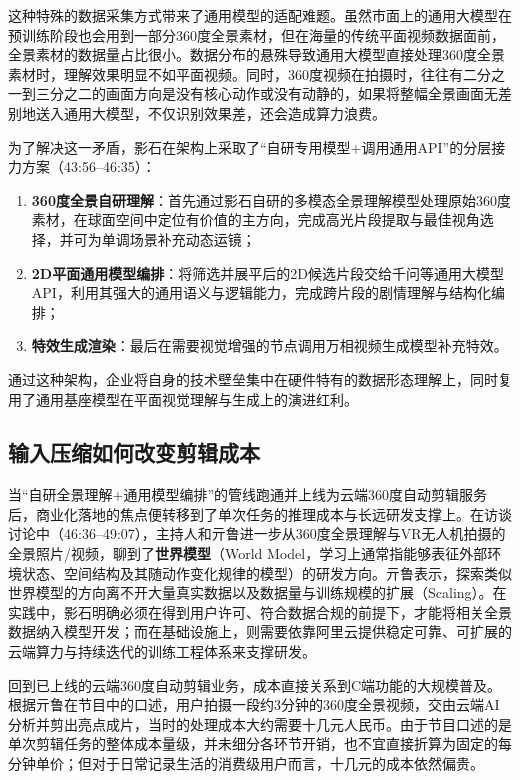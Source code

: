 \documentclass[UTF8,a4paper,11pt,fontset=fandol]{ctexart}
\begin{document}
这种特殊的数据采集方式带来了通用模型的适配难题。虽然市面上的通用大模型在预训练阶段也会用到一部分360度全景素材，但在海量的传统平面视频数据面前，全景素材的数据量占比很小。数据分布的悬殊导致通用大模型直接处理360度全景素材时，理解效果明显不如平面视频。同时，360度视频在拍摄时，往往有二分之一到三分之二的画面方向是没有核心动作或没有动静的，如果将整幅全景画面无差别地送入通用大模型，不仅识别效果差，还会造成算力浪费。

为了解决这一矛盾，影石在架构上采取了“自研专用模型+调用通用API”的分层接力方案（43:56–46:35）：
\begin{enumerate}
\item \textbf{360度全景自研理解}：首先通过影石自研的多模态全景理解模型处理原始360度素材，在球面空间中定位有价值的主方向，完成高光片段提取与最佳视角选择，并可为单调场景补充动态运镜；
\item \textbf{2D平面通用模型编排}：将筛选并展平后的2D候选片段交给千问等通用大模型API，利用其强大的通用语义与逻辑能力，完成跨片段的剧情理解与结构化编排；
\item \textbf{特效生成渲染}：最后在需要视觉增强的节点调用万相视频生成模型补充特效。
\end{enumerate}
通过这种架构，企业将自身的技术壁垒集中在硬件特有的数据形态理解上，同时复用了通用基座模型在平面视觉理解与生成上的演进红利。

\subsection{输入压缩如何改变剪辑成本}
当“自研全景理解+通用模型编排”的管线跑通并上线为云端360度自动剪辑服务后，商业化落地的焦点便转移到了单次任务的推理成本与长远研发支撑上。在访谈讨论中（46:36–49:07），主持人和亓鲁进一步从360度全景理解与VR无人机拍摄的全景照片/视频，聊到了\textbf{世界模型}（World Model，学习上通常指能够表征外部环境状态、空间结构及其随动作变化规律的模型）的研发方向。亓鲁表示，探索类似世界模型的方向离不开大量真实数据以及数据量与训练规模的扩展（Scaling）。在实践中，影石明确必须在得到用户许可、符合数据合规的前提下，才能将相关全景数据纳入模型开发；而在基础设施上，则需要依靠阿里云提供稳定可靠、可扩展的云端算力与持续迭代的训练工程体系来支撑研发。

回到已上线的云端360度自动剪辑业务，成本直接关系到C端功能的大规模普及。根据亓鲁在节目中的口述，用户拍摄一段约3分钟的360度全景视频，交由云端AI分析并剪出亮点成片，当时的处理成本大约需要十几元人民币。由于节目口述的是单次剪辑任务的整体成本量级，并未细分各环节开销，也不宜直接折算为固定的每分钟单价；但对于日常记录生活的消费级用户而言，十几元的成本依然偏贵。
\end{document}
